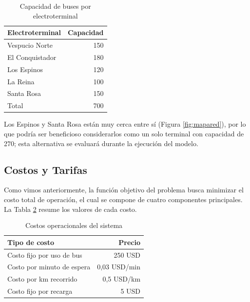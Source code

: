 \begin{table}[htb]
\begin{center}
\small
\caption[Capacidad de buses por electroterminal]{Capacidad de buses por electroterminal}
\label{tab:capacidadterminal}
\begin{tabular}{@{}l r@{}}\toprule
\textbf{Electroterminal} & \textbf{Capacidad} \\ \midrule
Vespucio Norte & 150 \\
El Conquistador & 180 \\
Los Espinos & 120 \\
La Reina & 100 \\
Santa Rosa & 150 \\
\midrule
Total & 700 \\
\bottomrule
\end{tabular}
\end{center}
\end{table}

Los Espinos y Santa Rosa est\'an muy cerca entre s\'i (Figura \ref{fig:mapared}), por lo que podr\'ia ser beneficioso considerarlos como un solo terminal con capacidad de 270; esta alternativa se evaluar\'a durante la ejecuci\'on del modelo.

\subsection{Costos y Tarifas \label{sec:costostarifas}}

Como vimos anteriormente, la funci\'on objetivo del problema busca minimizar el costo total de operaci\'on, el cual se compone de cuatro componentes principales. La Tabla \ref{tab:costos} resume los valores de cada costo.

\begin{table}[htb]
\begin{center}
\small
\caption[Costos operacionales del sistema]{Costos operacionales del sistema}
\label{tab:costos}
\begin{tabular}{@{}l r@{}}\toprule
\textbf{Tipo de costo} & \textbf{Precio} \\ \midrule
Costo fijo por uso de bus & 250 USD \\
Costo por minuto de espera & 0,03 USD/min \\
Costo por km recorrido & 0,5 USD/km \\
Costo fijo por recarga & 5 USD \\
\bottomrule
\end{tabular}
\end{center}
\end{table}

